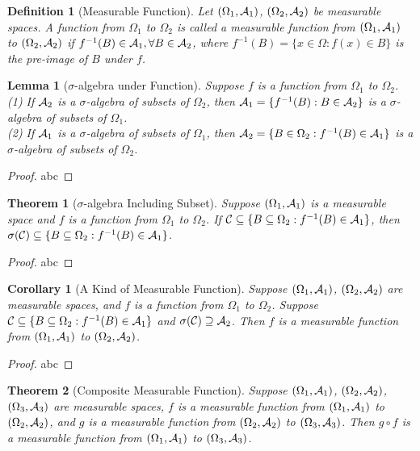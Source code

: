 \documentclass[openany,12pt]{book}
\newtheorem{theorem}{Theorem}[chapter]
\newtheorem{corollary}{Corollary}[chapter]
\newtheorem{lemma}{Lemma}[chapter]
\newtheorem{definition}{Definition}[chapter]
\begin{document}
\begin{definition}[Measurable Function]
  Let $(\Omega_1,\mathcal{A}_1)$, $(\Omega_2,\mathcal{A}_2)$ be measurable spaces. A function from $\Omega_1$ to $\Omega_2$ is called a measurable function from $(\Omega_1,\mathcal{A}_1)$ to  $(\Omega_2,\mathcal{A}_2)$ if $f^{-1}(B)\in \mathcal{A}_1,\forall B\in\mathcal{A}_2$, where $f^{-1} (B)=\{x\in\Omega:f(x)\in B\}$ is the
  pre-image of $B$ under $f$.
\end{definition}

\begin{lemma}[$\sigma$-algebra under Function]
  Suppose $f$ is a function from $\Omega_1$ to $\Omega_2$.\\
  (1) If $\mathcal{A}_2$ is a $\sigma$-algebra of subsets of  $\Omega_2$, then $\mathcal{A}_1=\{f^{-1} (B):B\in\mathcal{A} _2\}$ is a $\sigma$-algebra of subsets of $\Omega_1$.\\
  (2) If $\mathcal{A}_1$ is a $\sigma$-algebra of subsets of $\Omega_1$, then $\mathcal{A}_2=\{B\in\Omega_2:f^{-1} (B)\in\mathcal{A}_1\}$ is a $\sigma$-algebra of subsets of $\Omega_2$.
\end{lemma}

\begin{proof}
  abc
\end{proof}

\begin{theorem}[$\sigma$-algebra Including Subset]
  Suppose $(\Omega_1,\mathcal{A}_1)$ is a measurable space and $f$ is a function from $\Omega_1$ to $\Omega_2$. If $\mathcal{C}\subseteq\{B\subseteq\Omega_2: f^{-1} (B)\in\mathcal{A}_1\}$, then $\sigma(\mathcal{C})\subseteq\{B\subseteq\Omega_2: f^{-1} (B)\in\mathcal{A}_1\}$.
\end{theorem}

\begin{proof}
  abc
\end{proof}

\begin{corollary}[A Kind of Measurable Function]
  Suppose $(\Omega_1,\mathcal{A}_1)$, $(\Omega_2,\mathcal{A}_2)$ are measurable spaces, and $f$ is a function from $\Omega_1$ to $\Omega_2$. Suppose $\mathcal{C}\subseteq\{B\subseteq\Omega_2: f^{-1} (B)\in\mathcal{A}_1\}$ and $\sigma(\mathcal{C})\supseteq\mathcal{A}_2$. Then $f$ is a measurable function from $(\Omega_1,\mathcal{A}_1)$ to $(\Omega_2,\mathcal{A}_2)$.
\end{corollary}

\begin{proof}
  abc
\end{proof}

\begin{theorem}[Composite Measurable Function]
  Suppose $(\Omega_1,\mathcal{A}_1)$, $(\Omega_2,\mathcal{A}_2)$, $(\Omega_3,\mathcal{A}_3)$ are measurable spaces, $f$ is a measurable function from $(\Omega_1,\mathcal{A}_1)$ to $(\Omega_2,\mathcal{A}_2)$, and $g$ is a measurable function from $(\Omega_2,\mathcal{A}_2)$ to $(\Omega_3,\mathcal{A}_3)$. Then $g\circ f$ is a measurable function from  $(\Omega_1,\mathcal{A}_1)$ to $(\Omega_3,\mathcal{A}_3)$.
\end{theorem}
\end{document}
